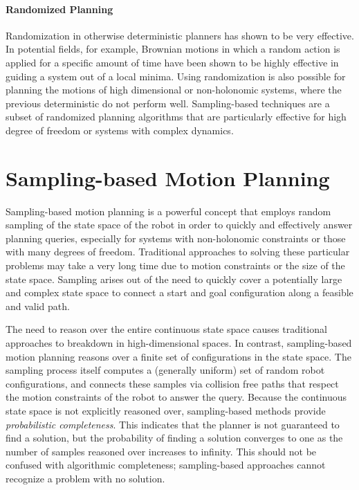 \paragraph {Randomized Planning}
Randomization in otherwise deterministic planners has shown to be very
effective.  In potential fields, for example, Brownian motions in which a random
action is applied for a specific amount of time have been shown to be highly 
effective in guiding a system out of a local minima.  Using randomization is
also possible for planning the motions of high dimensional or non-holonomic
systems, where the previous deterministic do not perform well.  Sampling-based
techniques are a subset of randomized planning algorithms that are particularly
effective for high degree of freedom or systems with complex dynamics.

\section {Sampling-based Motion Planning}
\label {sect:samplingbasedplanning}
Sampling-based motion planning is a powerful concept that employs random
sampling of the state space of the robot in order to quickly and 
effectively answer planning queries, especially for systems with non-holonomic 
constraints or those with many degrees of freedom.  Traditional approaches to 
solving these particular problems may take a very long time due to motion 
constraints or the size of the state space.  Sampling arises out of the need to 
quickly cover a potentially large and complex state space to connect a start 
and goal configuration along a feasible and valid path.  

The need to reason over the entire continuous state space causes traditional
approaches to breakdown in high-dimensional spaces.  In contrast, sampling-based
motion planning reasons over a finite set of configurations in the state space.  
The sampling process itself computes a (generally uniform) set of random robot
configurations, and connects these samples via collision free paths that respect
the motion constraints of the robot to answer the query.  Because the continuous
state space is not explicitly reasoned over, sampling-based methods provide {\it
probabilistic completeness}.  This indicates that the planner is not guaranteed 
to find a solution, but the probability of finding a solution converges to one 
as the number of samples reasoned over increases to infinity.  This should not 
be confused with algorithmic completeness; sampling-based approaches cannot 
recognize a problem with no solution.


